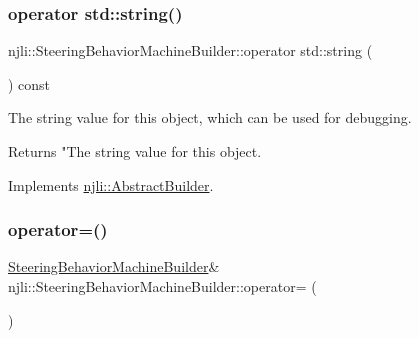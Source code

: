 \subsubsection{\texorpdfstring{operator std\+::string()}{operator std::string()}}
{\footnotesize\ttfamily njli\+::\+Steering\+Behavior\+Machine\+Builder\+::operator std\+::string (\begin{DoxyParamCaption}{ }\end{DoxyParamCaption}) const\hspace{0.3cm}{\ttfamily [virtual]}}

The string value for this object, which can be used for debugging.

\begin{DoxyReturn}{Returns}
"The string value for this object. 
\end{DoxyReturn}


Implements \mbox{\hyperlink{classnjli_1_1_abstract_builder_a3e6e553e06d1ca30517ad5fb0bd4d000}{njli\+::\+Abstract\+Builder}}.

\mbox{\label{classnjli_1_1_steering_behavior_machine_builder_ae526bfd3d7dff97423afc16b9057a498}} 
\subsubsection{\texorpdfstring{operator=()}{operator=()}}
{\footnotesize\ttfamily \mbox{\hyperlink{classnjli_1_1_steering_behavior_machine_builder}{Steering\+Behavior\+Machine\+Builder}}\& njli\+::\+Steering\+Behavior\+Machine\+Builder\+::operator= (\begin{DoxyParamCaption}\item[{const \mbox{\hyperlink{classnjli_1_1_steering_behavior_machine_builder}{Steering\+Behavior\+Machine\+Builder}} \&}]{ }\end{DoxyParamCaption})\hspace{0.3cm}{\ttfamily [protected]}}

\mbox{\label{classnjli_1_1_steering_behavior_machine_builder_aea21ad5a6fa0c1ed9decd6501e16751d}} 
